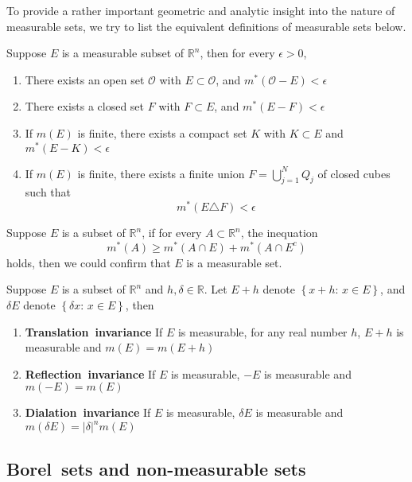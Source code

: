 \documentclass{ctexbook}
\begin{document}
To provide a rather important geometric and analytic insight into the nature of measurable sets, we try to list the
equivalent definitions of measurable sets below.
\begin{thm}
    Suppose $E$ is a measurable subset of $\mathbb{R}^n$, then for every $\epsilon>0$,
    \begin{enumerate}
        \item There exists an open set $\mathcal{O}$ with $E \subset \mathcal{O}$, and $m^*(\mathcal{O} - E) < \epsilon$
        \item There exists a closed set $F$ with $F \subset E$, and $m^*(E-F)<\epsilon$
        \item If $m(E)$ is finite, there exists a compact set $K$ with $K \subset E$ and $m^*(E-K) < \epsilon$
        \item If $m(E)$ is finite, there exists a finite union $F=\bigcup\limits_{j=1}^N Q_j$ of closed cubes such that \[m^*(E\triangle F)<\epsilon\]
    \end{enumerate}
\end{thm}
\begin{thm}
    Suppose $E$ is a subset of $\mathbb{R}^n$, if for every $A\subset \mathbb{R}^n$, the inequation
    \[m^*(A) \geq m^*(A\cap E)+m^*(A\cap E^c)\]
    holds, then we could confirm that $E$ is a measurable set.
\end{thm}

\begin{thm}
    Suppose $E$ is a subset of $\mathbb{R}^n $ and $h,\delta \in \mathbb{R}$. Let $E+h$ denote $\left\{x+h:\, x\in E\right\}$, and
    $\delta E$ denote $\left\{\delta x:\, x\in E\right\} $, then
    \begin{enumerate}
        \item \textbf{Translation~invariance} If $E$ is measurable, for any real number $h$, $E+h$ is measurable and $m(E) = m(E+h)$
        \item \textbf{Reflection~invariance} If $E$ is measurable, $-E$ is measurable and $m(-E) = m(E)$
        \item \textbf{Dialation~invariance} If $E$ is measurable, $\delta E$ is measurable and $m(\delta E) = \left\lvert\delta \right\rvert^nm(E)$
    \end{enumerate}
\end{thm}

\subsection*{Borel~sets and non-measurable sets}
\end{document}
